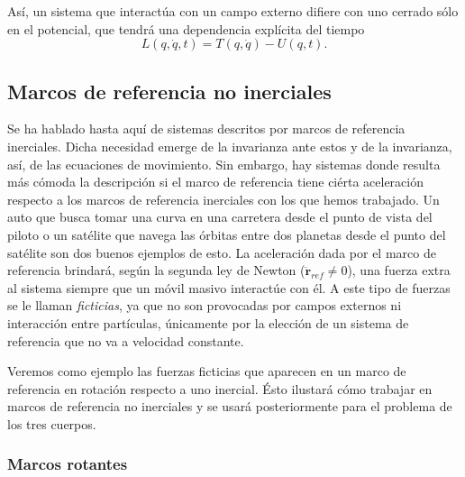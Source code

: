 Así, un sistema que interactúa con un campo externo difiere con uno cerrado sólo en el potencial, que tendrá una dependencia explícita del tiempo
\begin{equation}
 L(q,\dot{q},t) = T(q,\dot{q}) - U(q,t).
 \label{eq:lagrangian_open_generalized}
\end{equation}

\subsection{Marcos de referencia no inerciales}
\label{sec:ficticious_forces}

Se ha hablado hasta aquí de sistemas descritos por marcos de referencia inerciales. Dicha necesidad emerge de la invarianza ante estos y de la invarianza, así, de las ecuaciones de movimiento. Sin embargo, hay sistemas donde resulta más cómoda la descripción si el marco de referencia tiene ciérta aceleración respecto a los marcos de referencia inerciales con los que hemos trabajado. Un auto que busca tomar una curva en una carretera desde el punto de vista del piloto o un satélite que navega las órbitas entre dos planetas desde el punto del satélite son dos buenos ejemplos de esto. La aceleración dada por el marco de referencia brindará, según la segunda ley de Newton ($\ddot{\mathbf{r}}_{ref} \neq 0$), una fuerza extra al sistema siempre que un móvil masivo interactúe con él. A este tipo de fuerzas se le llaman \textit{ficticias}, ya que no son provocadas por campos externos ni interacción entre partículas, únicamente por la elección de un sistema de referencia que no va a velocidad constante. 

Veremos como ejemplo las fuerzas ficticias que aparecen en un marco de referencia en rotación respecto a uno inercial. Ésto ilustará cómo trabajar en marcos de referencia no inerciales y se usará posteriormente para el problema de los tres cuerpos. 

\subsubsection{Marcos rotantes}

